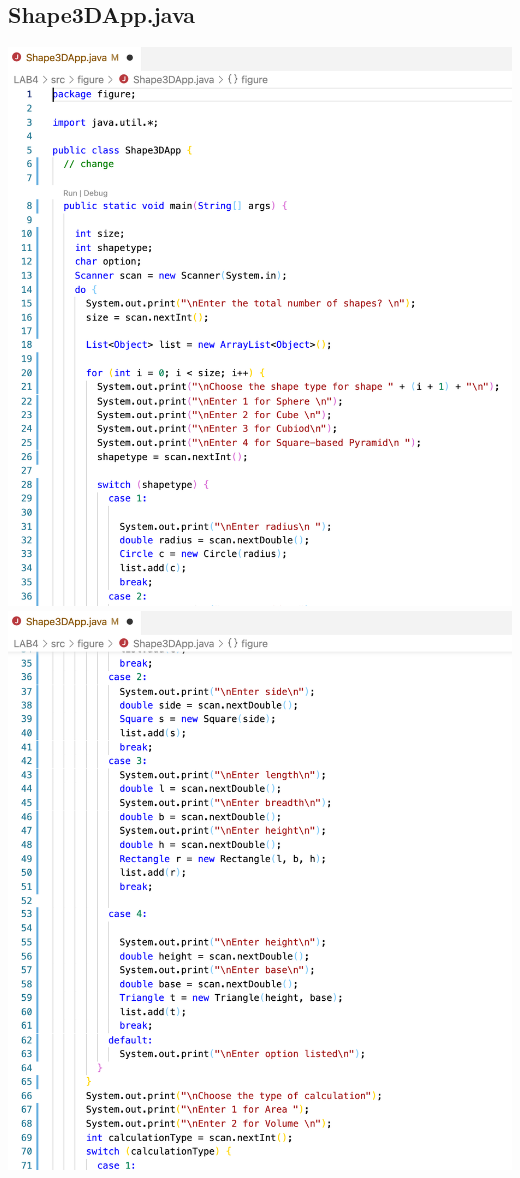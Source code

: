 \documentclass[hidelinks,12pt]{article}
\begin{document}
    \subsection{Shape3DApp.java}
    \includegraphics[scale=0.35]{z_shape3dapp1.png}
    \includegraphics[scale=0.35]{z_shape3dapp2.png}
    
\end{document}
